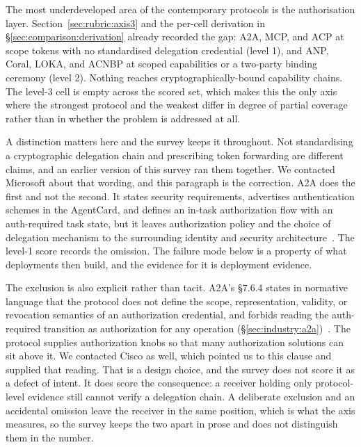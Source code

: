 The most underdeveloped area of the contemporary protocols
is the authorisation layer. Section~\ref{sec:rubric:axis3}
and the per-cell derivation in §\ref{sec:comparison:derivation}
already recorded the gap: A2A, MCP, and ACP at scope tokens
with no standardised delegation credential (level 1), and
ANP, Coral, LOKA, and ACNBP at scoped capabilities or a
two-party binding ceremony (level 2). Nothing reaches
cryptographically-bound capability chains. The level-3
cell is empty across the scored set, which makes this the
only axis where the strongest protocol and the weakest
differ in degree of partial coverage rather than in
whether the problem is addressed at all.

A distinction matters here and the survey keeps it
throughout. Not standardising a cryptographic delegation
chain and prescribing token forwarding are different
claims, and an earlier version of this survey ran them
together. We contacted Microsoft about that wording, and
this paragraph is the correction. A2A does the first and not
the second. It states
security requirements, advertises authentication schemes in
the AgentCard, and defines an in-task authorization flow
with an auth-required task state, but it leaves
authorization policy and the choice of delegation mechanism
to the surrounding identity and security
architecture~\cite{spec_a2a}. The level-1 score records the
omission. The failure mode below is a property of what
deployments then build, and the evidence for it is
deployment evidence.

The exclusion is also explicit rather than tacit. A2A's
\S7.6.4 states in normative language that the protocol does
not define the scope, representation, validity, or revocation
semantics of an authorization credential, and forbids reading
the auth-required transition as authorization for any
operation (\S\ref{sec:industry:a2a})~\cite{spec_a2a}. The
protocol supplies authorization knobs so that many
authorization solutions can sit above it. We contacted Cisco
as well, which pointed us to this clause and supplied that
reading. That is a design
choice, and the survey does not score it as a defect of
intent. It does score the consequence: a receiver holding
only protocol-level evidence still cannot verify a
delegation chain. A deliberate exclusion and an accidental
omission leave the receiver in the same position, which is
what the axis measures, so the survey keeps the two apart in
prose and does not distinguish them in the number.

